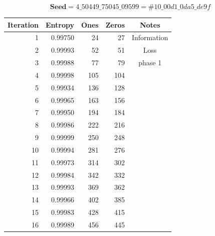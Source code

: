 \documentclass[letterpaper]{article}
\begin{document}
\begin{multicols}{2}
    \begin{table}[th]
        \centering
        $$\textbf{Seed} = 4\_50449\_75045\_09599 = \#10\_00d1\_0da5\_de9f$$
        \begin{tabular}{|r|r|r|r|c|}
            \hline
            \textbf{Iteration} & \textbf{Entropy} & \textbf{Ones} & \textbf{Zeros} & \textbf{Notes}   \\
            \hline
            1                  & 0.99750          & 24            & 27             & Information \\
            2                  & 0.99993          & 52            & 51             & Loss          \\
            3                  & 0.99988          & 77            & 79             & phase 1                 \\
            4                  & 0.99998          & 105           & 104            &                  \\
            5                  & 0.99934          & 136           & 128            &                  \\
            6                  & 0.99965          & 163           & 156            &                  \\
            7                  & 0.99950          & 194           & 184            &                  \\
            8                  & 0.99986          & 222           & 216            &                  \\
            9                  & 0.99999          & 250           & 248            &                  \\
            10                 & 0.99994          & 281           & 276            &                  \\
            11                 & 0.99973          & 314           & 302            &                  \\
            12                 & 0.99984          & 342           & 332            &                  \\
            13                 & 0.99993          & 369           & 362            &                  \\
            14                 & 0.99966          & 402           & 385            &                  \\
            15                 & 0.99983          & 428           & 415            &                  \\
            16                 & 0.99989          & 456           & 445            &                  \\

\end{tabular}
\end{table}
\end{multicols}
\end{document}
